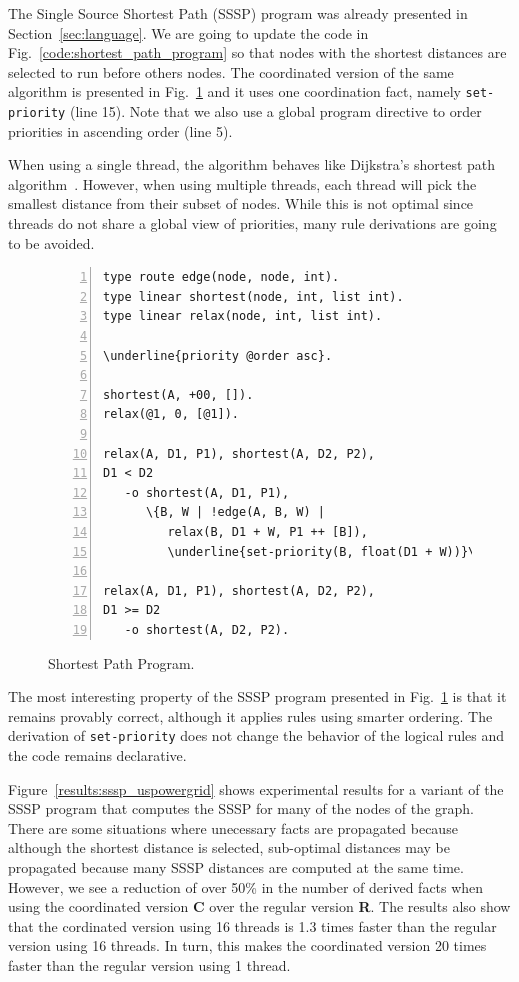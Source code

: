 The Single Source Shortest Path (SSSP) program was already presented in
Section~\ref{sec:language}. We are going to update the code in
Fig.~\ref{code:shortest_path_program} so that nodes with the shortest distances
are selected to run before others nodes. The coordinated version of the same
algorithm is presented in Fig.~\ref{code:shortest_path_program_coord} and it
uses one coordination fact, namely \texttt{set-priority} (line 15). Note that we
also use a global program directive to order priorities in ascending order (line
5).

When using a single thread, the algorithm behaves like
Dijkstra's shortest path algorithm~\cite{Dijkstra}. However, when using multiple
threads, each thread will pick the smallest distance from their subset of nodes.
While this is not optimal since threads do not share a global view of priorities,
many rule derivations are going to be avoided.

\begin{figure}[h!]
\scriptsize\begin{Verbatim}[numbers=left,commandchars=\\\{\}]
type route edge(node, node, int).
type linear shortest(node, int, list int).
type linear relax(node, int, list int).

\underline{priority @order asc}.

shortest(A, +00, []).
relax(@1, 0, [@1]).

relax(A, D1, P1), shortest(A, D2, P2),
D1 < D2
   -o shortest(A, D1, P1),
      \{B, W | !edge(A, B, W) |
         relax(B, D1 + W, P1 ++ [B]),
         \underline{set-priority(B, float(D1 + W))}\}.

relax(A, D1, P1), shortest(A, D2, P2),
D1 >= D2
   -o shortest(A, D2, P2).
\end{Verbatim}
  \caption{Shortest Path Program.}
  \label{code:shortest_path_program_coord}
\end{figure}
\normalsize

The most interesting property of the SSSP program presented in
Fig.~\ref{code:shortest_path_program_coord} is that it remains provably correct,
although it applies rules using smarter ordering. The derivation of
\texttt{set-priority} does not change the behavior of the logical rules and the
code remains declarative.

Figure~\ref{results:sssp_uspowergrid} shows experimental results for a variant of
the SSSP program that computes the SSSP for many of the nodes of the graph.
There are some situations where unecessary facts are propagated
because although the shortest distance is selected, sub-optimal distances may be
propagated because many SSSP distances are computed at the same time.
However, we see a reduction of over 50\% in the number of
derived facts when using the coordinated version \textbf{C} over the regular
version \textbf{R}. The results also show that the cordinated
version using 16 threads is 1.3 times faster than the regular version using 16
threads. In turn, this makes the coordinated version 20 times faster
than the regular version using 1 thread.


